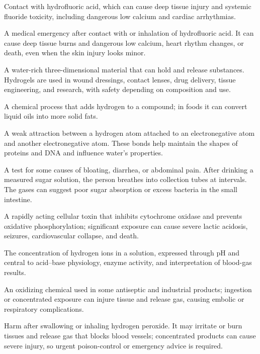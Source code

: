  Contact with hydrofluoric acid, which can cause deep tissue injury and systemic fluoride
toxicity, including dangerous low calcium and cardiac arrhythmias.

 A medical emergency after contact with or inhalation of hydrofluoric acid. It can cause deep tissue burns and dangerous low calcium, heart rhythm changes, or death, even when the skin injury looks minor.

 A water-rich three-dimensional material that can hold and release substances. Hydrogels are used in wound dressings, contact lenses, drug delivery, tissue engineering, and research, with safety depending on composition and use.

 A chemical process that adds hydrogen to a compound; in foods it can convert liquid oils into more solid fats.

 A weak attraction between a hydrogen atom attached to an electronegative atom and another electronegative atom. These bonds help maintain the shapes of proteins and DNA and influence water’s properties.

 A test for some causes of bloating, diarrhea, or abdominal pain. After drinking a measured sugar solution, the person breathes into collection tubes at intervals. The gases can suggest poor sugar absorption or excess bacteria in the small intestine.

 A rapidly acting cellular toxin that inhibits cytochrome oxidase and prevents oxidative phosphorylation; significant exposure can cause severe lactic acidosis, seizures, cardiovascular collapse, and death.

 The concentration of hydrogen ions in a solution, expressed through pH and central to acid--base physiology, enzyme activity, and interpretation of blood-gas results.

 An oxidizing chemical used in some antiseptic and industrial products; ingestion or concentrated exposure can injure tissue and release gas, causing embolic or respiratory complications.

 Harm after swallowing or inhaling hydrogen peroxide. It may irritate or burn tissues and release gas that blocks blood vessels; concentrated products can cause severe injury, so urgent poison-control or emergency advice is required.

